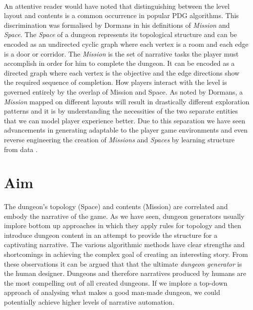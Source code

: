 \documentclass{UoYCSproject}
\begin{document}
\paragraph{}
An attentive reader would have noted that distinguishing between the level layout and contents is a common occurrence in popular PDG algorithms. This discrimination was formalised by Dormans \parencite{DormansMS} in his definitions of \textit{Mission} and \textit{Space}.
The \textit{Space} of a dungeon represents its topological structure and can be encoded as an undirected cyclic graph where each vertex is a room and each edge is a door or corridor. The \textit{Mission} is the set of narrative tasks the player must accomplish in order for him to complete the dungeon. It can be encoded as a directed graph where each vertex is the objective and the edge directions show the required sequence of completion. How players interact with the level is governed entirely by the overlap of Mission and Space. As noted by Dormans, a \textit{Mission} mapped on different layouts will result in drastically different exploration patterns and it is by understanding the necessities of the two separate entities that we can model player experience better. Due to this separation we have seen advancements in generating adaptable to the player game environments \parencite{DormansAE} and even reverse engineering the creation of \textit{Missions} and \textit{Spaces} by learning structure from data \parencite{SummervilleLearningOfZelda}.

\section{Aim}

\paragraph{}
The dungeon’s topology (Space) and contents (Mission) are correlated and embody the narrative of the game. As we have seen, dungeon generators usually implore bottom up approaches in which they apply rules for topology and then introduce dungeon content in an attempt to provide the structure for a captivating narrative. The various algorithmic methods have clear strengths and shortcomings in achieving the complex goal of creating an interesting story. From these observations it can be argued that that the ultimate \textit{dungeon generator} is the human designer. Dungeons and therefore narratives produced by humans are the most compelling out of all created dungeons. If we implore a top-down approach of analysing what makes a good man-made dungeon, we could potentially achieve higher levels of narrative automation.
\end{document}
